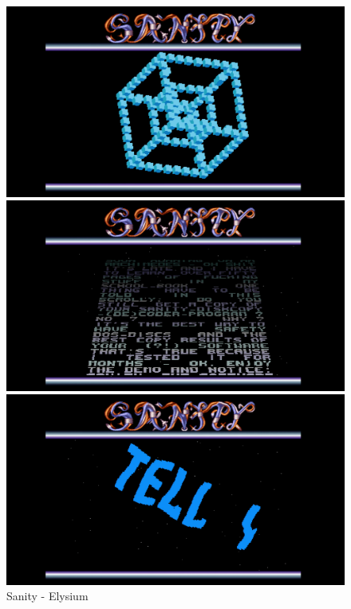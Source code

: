 \begin{figure}[h]
  \begin{minipage}[b]{0.30\linewidth}
    \centering
    \includegraphics[width=\linewidth]{images/demoscene/demos/sani1.png}
  \end{minipage}
  \hfill
  \begin{minipage}[b]{0.30\linewidth}
    \centering
    \includegraphics[width=\linewidth]{images/demoscene/demos/sani2.png}
  \end{minipage}
  \hfill
  \begin{minipage}[b]{0.30\linewidth}
    \centering
    \includegraphics[width=\linewidth]{images/demoscene/demos/sani3.png}
  \end{minipage}
  \caption{Sanity - Elysium}
  \label{sanity}
\end{figure}


